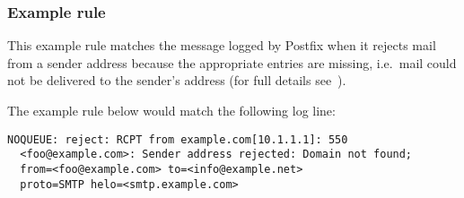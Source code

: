 \label{rules}

\subsubsection{Example rule}

\label{example rule}

This example rule matches the message logged by Postfix when it rejects
mail from a sender address because the appropriate \DNS{} entries are
missing, i.e.\ mail could not be delivered to the sender's address (for
full details see~\cite{reject-unknown-sender-domain}).

The example rule below would match the following log line:

\begin{verbatim}
NOQUEUE: reject: RCPT from example.com[10.1.1.1]: 550
  <foo@example.com>: Sender address rejected: Domain not found;
  from=<foo@example.com> to=<info@example.net>
  proto=SMTP helo=<smtp.example.com>
\end{verbatim}

